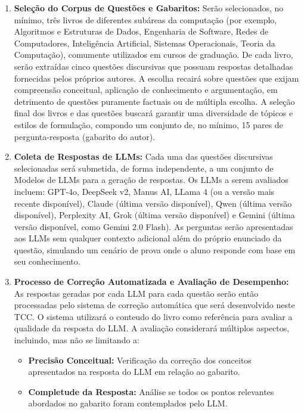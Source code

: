 \begin{enumerate}
    \item \textbf{Seleção do Corpus de Questões e Gabaritos:} Serão selecionados, no mínimo, três livros de diferentes subáreas da computação (por exemplo, Algoritmos e Estruturas de Dados, Engenharia de Software, Redes de Computadores, Inteligência Artificial, Sistemas Operacionais, Teoria da Computação), comumente utilizados em cursos de graduação. De cada livro, serão extraídas cinco questões discursivas que possuam respostas detalhadas fornecidas pelos próprios autores. A escolha recairá sobre questões que exijam compreensão conceitual, aplicação de conhecimento e argumentação, em detrimento de questões puramente factuais ou de múltipla escolha. A seleção final dos livros e das questões buscará garantir uma diversidade de tópicos e estilos de formulação, compondo um conjunto de, no mínimo, 15 pares de pergunta-resposta (gabarito do autor).

    \item \textbf{Coleta de Respostas de LLMs:} Cada uma das questões discursivas selecionadas será submetida, de forma independente, a um conjunto de Modelos de LLMs para a geração de respostas. Os LLMs a serem avaliados incluem: GPT-4o, DeepSeek v2, Manus AI, LLama 4 (ou a versão mais recente disponível), Claude (última versão disponível), Qwen (última versão disponível), Perplexity AI, Grok (última versão disponível) e Gemini (última versão disponível, como Gemini 2.0 Flash). As perguntas serão apresentadas aos LLMs sem qualquer contexto adicional além do próprio enunciado da questão, simulando um cenário de prova onde o aluno responde com base em seu conhecimento.

    \item \textbf{Processo de Correção Automatizada e Avaliação de Desempenho:} As respostas geradas por cada LLM para cada questão serão então processadas pelo sistema de correção automática que será desenvolvido neste TCC. O sistema utilizará o conteudo do livro como referência para avaliar a qualidade da resposta do LLM. A avaliação considerará múltiplos aspectos, incluindo, mas não se limitando a:

    \begin{itemize}
        \item \textbf{Precisão Conceitual:} Verificação da correção dos conceitos apresentados na resposta do LLM em relação ao gabarito.

        \item  \textbf{Completude da Resposta:} Análise se todos os pontos relevantes abordados no gabarito foram contemplados pelo LLM.


\end{itemize}
\end{enumerate}
